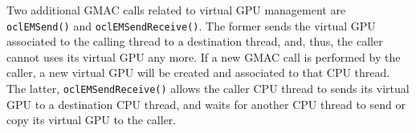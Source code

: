 Two additional GMAC calls related to virtual GPU management are \texttt{ocl\-EM\-Send()} and 
\texttt{oclEMSendReceive()}. The former sends the virtual GPU associated to the calling thread to a 
destination thread, and, thus, the caller cannot uses its virtual GPU any more. If a new GMAC call 
is performed by the caller, a new virtual GPU will be created and associated to that CPU thread. The 
latter, \texttt{oclEMSendReceive()} allows the caller CPU thread to sends its virtual GPU to a 
destination CPU thread, and waits for another CPU thread to send or copy its virtual GPU to the 
caller. 

